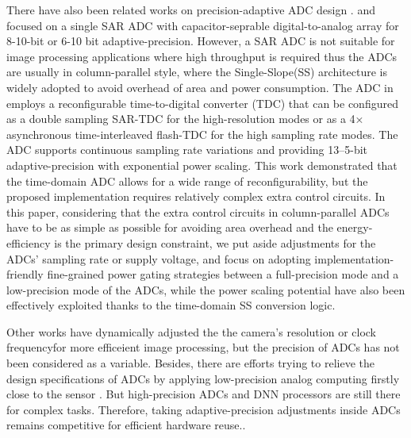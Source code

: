 There have also been related works on precision-adaptive ADC design \cite{zhu_06_2013}\cite{zhu_6--10-bit_2015}\cite{el-halwagy_100-mss5-gss_2018}. \cite{zhu_06_2013} and \cite{zhu_6--10-bit_2015} focused on a single SAR ADC with capacitor-seprable digital-to-analog array for 8-10-bit or 6-10 bit adaptive-precision.
However, a SAR ADC is not suitable for image processing applications where high throughput is required thus the ADCs are usually in column-parallel style, where the Single-Slope(SS)
architecture is widely adopted to avoid overhead of area and power consumption.  
The ADC in \cite{zhu_6--10-bit_2015} employs a reconfigurable time-to-digital converter (TDC) that can be configured as a double sampling SAR-TDC for the high-resolution modes or as a 4× asynchronous time-interleaved flash-TDC for the high sampling rate modes. The ADC supports continuous sampling rate variations and providing 13–5-bit
adaptive-precision with exponential power scaling. This work demonstrated that the time-domain ADC allows for a wide range of reconfigurability, but the proposed implementation requires relatively complex extra control circuits. 
In this paper, considering that the extra control circuits in column-parallel ADCs have to be as simple as possible for avoiding area overhead and the energy-efficiency is the primary design constraint, we put aside adjustments for the ADCs' sampling rate or supply voltage, and focus on adopting implementation-friendly fine-grained power gating strategies between a full-precision mode and a low-precision mode of the ADCs, while the power scaling potential have also been effectively exploited thanks to the time-domain SS conversion logic.

Other works have dynamically adjusted the the camera’s resolution\cite{lubana_digital_2018} or clock frequency\cite{likamwa_energy_2013}for more efficeient image processing, but the precision of ADCs has not been considered as a variable. Besides, there are efforts trying to relieve the design specifications of ADCs by applying low-precision analog computing firstly close to the sensor \cite{likamwa_redeye_2016}\cite{chen_asp_2016}\cite{liu_ns-cim_2020}. 
But high-precision ADCs and DNN processors are still there for complex tasks. Therefore, taking adaptive-precision adjustments inside ADCs remains competitive for efficient hardware reuse..
 
